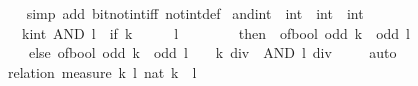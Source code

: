 \begin{isabellebody}
%
\isadelimproof
\ \ %
\endisadelimproof
%
\isatagproof
{}\isamarkupfalse%
\ {\isacharparenleft}{\kern0pt}simp\ add{\isacharcolon}{\kern0pt}\ bit{\isacharunderscore}{\kern0pt}not{\isacharunderscore}{\kern0pt}int{\isacharunderscore}{\kern0pt}iff{\isacharprime}{\kern0pt}\ not{\isacharunderscore}{\kern0pt}int{\isacharunderscore}{\kern0pt}def{\isacharparenright}{\kern0pt}%
\endisatagproof
{\isafoldproof}%
%
\isadelimproof
\isanewline
%
\endisadelimproof
\isanewline
{}\isamarkupfalse%
\ and{\isacharunderscore}{\kern0pt}int\ {\isacharcolon}{\kern0pt}{\isacharcolon}{\kern0pt}\ {\isacartoucheopen}int\ {\isasymRightarrow}\ int\ {\isasymRightarrow}\ int{\isacartoucheclose}\isanewline
\ \ \ {\isacartoucheopen}{\isacharparenleft}{\kern0pt}k{\isacharcolon}{\kern0pt}{\isacharcolon}{\kern0pt}int{\isacharparenright}{\kern0pt}\ AND\ l\ {\isacharequal}{\kern0pt}\ {\isacharparenleft}{\kern0pt}if\ k\ {\isasymin}\ {\isacharbraceleft}{\kern0pt}{}{\isacharcomma}{\kern0pt}\ {\isacharminus}{\kern0pt}\ {}{\isacharbraceright}{\kern0pt}\ {\isasymand}\ l\ {\isasymin}\ {\isacharbraceleft}{\kern0pt}{}{\isacharcomma}{\kern0pt}\ {\isacharminus}{\kern0pt}\ {}{\isacharbraceright}{\kern0pt}\isanewline
\ \ \ \ then\ {\isacharminus}{\kern0pt}\ of{\isacharunderscore}{\kern0pt}bool\ {\isacharparenleft}{\kern0pt}odd\ k\ {\isasymand}\ odd\ l{\isacharparenright}{\kern0pt}\isanewline
\ \ \ \ else\ of{\isacharunderscore}{\kern0pt}bool\ {\isacharparenleft}{\kern0pt}odd\ k\ {\isasymand}\ odd\ l{\isacharparenright}{\kern0pt}\ {\isacharplus}{\kern0pt}\ {}\ {\isacharasterisk}{\kern0pt}\ {\isacharparenleft}{\kern0pt}{\isacharparenleft}{\kern0pt}k\ div\ {}{\isacharparenright}{\kern0pt}\ AND\ {\isacharparenleft}{\kern0pt}l\ div\ {}{\isacharparenright}{\kern0pt}{\isacharparenright}{\kern0pt}{\isacharparenright}{\kern0pt}{\isacartoucheclose}\isanewline
%
\isadelimproof
\ \ %
\endisadelimproof
%
\isatagproof
{}\isamarkupfalse%
\ auto%
\endisatagproof
{\isafoldproof}%
%
\isadelimproof
\isanewline
%
\endisadelimproof
\isanewline
{}\isamarkupfalse%
%
\isadelimproof
\ %
\endisadelimproof
%
\isatagproof
{}\isamarkupfalse%
\ {\isacharparenleft}{\kern0pt}relation\ {\isacartoucheopen}measure\ {\isacharparenleft}{\kern0pt}{\isasymlambda}{\isacharparenleft}{\kern0pt}k{\isacharcomma}{\kern0pt}\ l{\isacharparenright}{\kern0pt}{\isachardot}{\kern0pt}\ nat\ {\isacharparenleft}{\kern0pt}{\isasymbar}k{\isasymbar}\ {\isacharplus}{\kern0pt}\ {\isasymbar}l{\isasymbar}{\isacharparenright}{\kern0pt}{\isacharparenright}{\kern0pt}{\isacartoucheclose}{\isacharparenright}{\kern0pt}\isanewline

\end{isabellebody}
